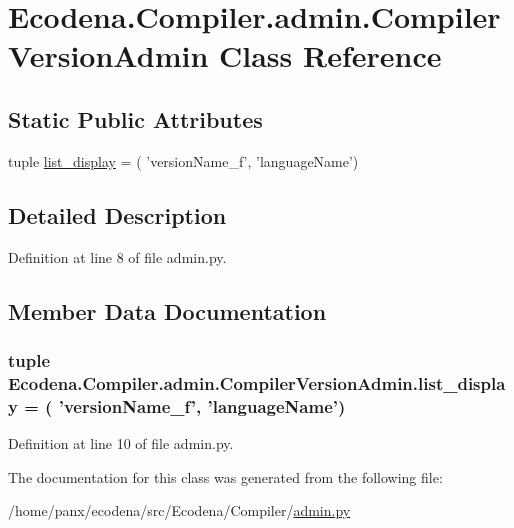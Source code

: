 \hypertarget{class_ecodena_1_1_compiler_1_1admin_1_1_compiler_version_admin}{
\section{Ecodena.Compiler.admin.CompilerVersionAdmin Class Reference}
\label{dc/dbe/class_ecodena_1_1_compiler_1_1admin_1_1_compiler_version_admin}
}
\subsection*{Static Public Attributes}
\begin{DoxyCompactItemize}
\item 
tuple \hyperlink{class_ecodena_1_1_compiler_1_1admin_1_1_compiler_version_admin_ac42037866619b1da3ca31bfb4bf78536}{list\_\-display} = ( 'versionName\_\-f', 'languageName')
\end{DoxyCompactItemize}


\subsection{Detailed Description}


Definition at line 8 of file admin.py.



\subsection{Member Data Documentation}
\hypertarget{class_ecodena_1_1_compiler_1_1admin_1_1_compiler_version_admin_ac42037866619b1da3ca31bfb4bf78536}{
\subsubsection[{list\_\-display}]{\setlength{\rightskip}{0pt plus 5cm}tuple {\bf Ecodena.Compiler.admin.CompilerVersionAdmin.list\_\-display} = ( 'versionName\_\-f', 'languageName')}}
\label{dc/dbe/class_ecodena_1_1_compiler_1_1admin_1_1_compiler_version_admin_ac42037866619b1da3ca31bfb4bf78536}


Definition at line 10 of file admin.py.



The documentation for this class was generated from the following file:\begin{DoxyCompactItemize}
\item 
/home/panx/ecodena/src/Ecodena/Compiler/\hyperlink{_compiler_2admin_8py}{admin.py}\end{DoxyCompactItemize}
